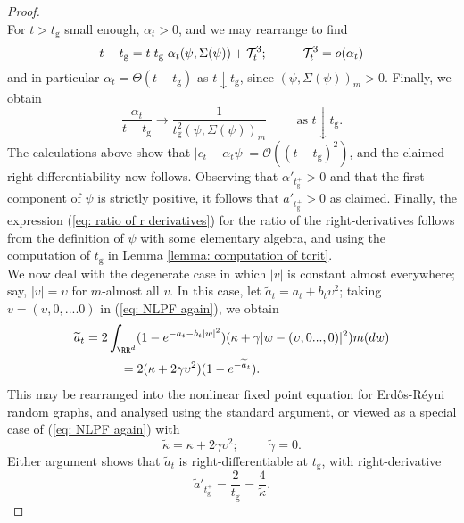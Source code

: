 \begin{proof}
\begin{equation}
  \end{equation} For $t>t_\mathrm{g}$ small enough, $\alpha_t>0$, and we may rearrange to find \begin{equation} t-t_\mathrm{g}=t\hspace{0.1cm}t_\mathrm{g}\hspace{0.1cm}\alpha_t(\psi,\Sigma(\psi))+\mathcal{T}^3_t;\hspace{1cm} \mathcal{T}^3_t=o(\alpha_t) \end{equation}  and in particular $\alpha_t=\Theta(t-t_\mathrm{g})$ as $t\downarrow t_\mathrm{g}$, since $(\psi, \Sigma(\psi))_m>0.$ Finally, we obtain \begin{equation} \frac{\alpha_t}{t-t_\mathrm{g}}\rightarrow\frac{1}{t_\mathrm{g}^2(\psi,\Sigma(\psi))_m}\hspace{1cm} \text{as }t\downarrow t_\mathrm{g}.  \end{equation} The calculations above show that $|c_t-\alpha_t\psi|=\mathcal{O}((t-t_\mathrm{g})^2)$, and the claimed right-differentiability now follows. Observing that $\alpha'_{t_\mathrm{g}^+}>0$ and that the first component of $\psi$ is strictly positive, it follows that $a'_{t_\mathrm{g}^+}>0$ as claimed. Finally, the expression (\ref{eq: ratio of r derivatives}) for the ratio of the right-derivatives follows from the definition of $\psi$ with some elementary algebra, and using the computation of $t_\mathrm{g}$ in Lemma \ref{lemma: computation of tcrit}. \bigskip \\  We now deal with the degenerate case in which $|v|$ is constant almost everywhere; say,  $|v|=\upsilon$ for $m$-almost all $v$. In this case, let $\widetilde{a}_t=a_t+b_t\upsilon^2$; taking $v=(\upsilon, 0,....0)$ in (\ref{eq: NLPF again}), we obtain \begin{equation} \begin{split} \label{eq: degenerate NLFP}
 \widetilde{a}_t&=2\int_{\RR^d} (1-e^{-a_t-b_t|w|^2})(\kappa+\gamma|w-(\upsilon,0...,0)|^2)m(dw) \\ & \hspace{1cm} = 2(\kappa+2\gamma\upsilon^2)(1-e^{-\widetilde{a}_t}).\end{split}\end{equation} This may be rearranged into the nonlinear fixed point equation for Erd\H{o}s-R\'eyni random graphs, and analysed using the standard argument, or viewed as a special case of (\ref{eq: NLPF again}) with  \begin{equation} \widetilde{\kappa}=\kappa+2\gamma\upsilon^2; \hspace{1cm}\widetilde{\gamma}=0. \end{equation} Either argument shows that $\widetilde{a}_t$ is right-differentiable at $t_\mathrm{g}$, with right-derivative \begin{equation} \widetilde{a}'_{t_\mathrm{g}^+}=\frac{2}{t_\mathrm{g}}=\frac{4}{\widetilde{\kappa}}.

\end{equation}
\end{proof}
